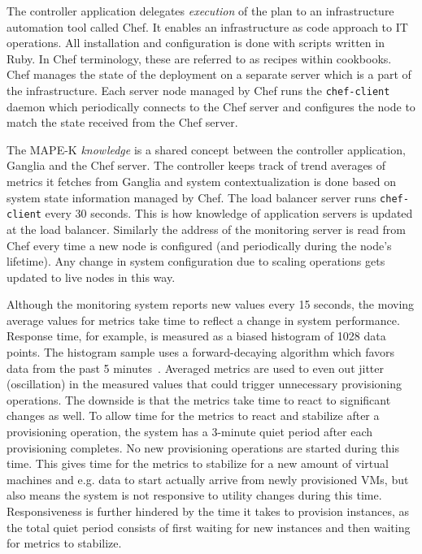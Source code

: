 \documentclass[english]{tktltiki2}
\theoremstyle{definition}
\theoremstyle{remark}
\begin{document}
The controller application delegates \textit{execution} of the plan to an
infrastructure automation tool called Chef. It enables an infrastructure as
code approach to IT operations. All installation and configuration is done
with scripts written in Ruby. In Chef terminology, these are referred to as
recipes within cookbooks. Chef manages the state of the deployment on a
separate server which is a part of the infrastructure. Each server node
managed by Chef runs the \texttt{chef-client} daemon which periodically
connects to the Chef server and configures the node to match the state
received from the Chef server.

The MAPE-K \textit{knowledge} is a shared concept between the controller
application, Ganglia and the Chef server. The controller keeps track of trend
averages of metrics it fetches from Ganglia and system contextualization is done
based on system state information managed by Chef. The load balancer server runs
\texttt{chef-client} every 30 seconds. This is how knowledge of application
servers is updated at the load balancer. Similarly the address of the monitoring
server is read from Chef every time a new node is configured (and periodically
during the node's lifetime). Any change in system configuration due to scaling
operations gets updated to live nodes in this way.

Although the monitoring system reports new values every 15 seconds, the moving
average values for metrics take time to reflect a change in system
performance. Response time, for example, is measured as a biased histogram of
1028 data points. The histogram sample uses a forward-decaying algorithm which
favors data from the past 5
minutes~\cite{forwardDecayHistogram}\cite{codahaleHistogram}. Averaged metrics
are used to even out jitter (oscillation) in the measured values that could
trigger unnecessary provisioning operations. The downside is that the metrics
take time to react to significant changes as well. To allow time for the
metrics to react and stabilize after a provisioning operation, the system has
a 3-minute quiet period after each provisioning completes. No new provisioning
operations are started during this time. This gives time for the metrics to
stabilize for a new amount of virtual machines and e.g. data to start actually
arrive from newly provisioned VMs, but also means the system is not responsive
to utility changes during this time. Responsiveness is further hindered by the
time it takes to provision instances, as the total quiet period consists of
first waiting for new instances and then waiting for metrics to stabilize.
\end{document}
